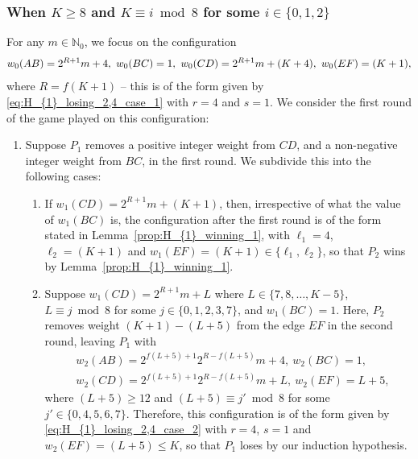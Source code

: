 \documentclass[11pt,reqno]{amsart}
\theoremstyle{definition}
\theoremstyle{definition}
\begin{document}
\subsubsection{When $K \geqslant 8$ and $K \equiv i \bmod 8$ for some $i \in \{0,1,2\}$}\label{subsubsec:H_{1}_losing_4_0,1,2} For any $m \in \mathbb{N}_{0}$, we focus on the configuration
\begin{equation}
w_{0}(AB)=2^{R+1}m+4,\ w_{0}(BC)=1,\ w_{0}(CD)=2^{R+1}m+(K+4),\ w_{0}(EF)=(K+1),\label{eq:H_{1}_losing_4_2_inductive}
\end{equation}
where $R=f(K+1)$ -- this is of the form given by \eqref{eq:H_{1}_losing_2,4_case_1} with $r=4$ and $s=1$. We consider the first round of the game played on this configuration:
\begin{enumerate}
\item Suppose $P_{1}$ removes a positive integer weight from $CD$, and a non-negative integer weight from $BC$, in the first round. We subdivide this into the following cases:
\begin{enumerate}
\item If $w_{1}(CD)=2^{R+1}m+(K+1)$, then, irrespective of what the value of $w_{1}(BC)$ is, the configuration after the first round is of the form stated in Lemma~\ref{prop:H_{1}_winning_1}, with $\ell_{1}=4$, $\ell_{2}=(K+1)$ and $w_{1}(EF)=(K+1) \in \{\ell_{1},\ell_{2}\}$, so that $P_{2}$ wins by Lemma~\ref{prop:H_{1}_winning_1}. 

\item Suppose $w_{1}(CD)=2^{R+1}m+L$ where $L \in \{7,8,\ldots,K-5\}$, $L \equiv j \bmod 8$ for some $j \in \{0,1,2,3,7\}$, and $w_{1}(BC)=1$. Here, $P_{2}$ removes weight $(K+1)-(L+5)$ from the edge $EF$ in the second round, leaving $P_{1}$ with
\begin{align}
{}&w_{2}(AB)=2^{f(L+5)+1}2^{R-f(L+5)}m+4,\ w_{2}(BC)=1,\nonumber\\
{}&w_{2}(CD)=2^{f(L+5)+1}2^{R-f(L+5)}m+L,\ w_{2}(EF)=L+5,\nonumber
\end{align}
where $(L+5) \geqslant 12$ and $(L+5) \equiv j' \bmod 8$ for some $j' \in \{0,4,5,6,7\}$. Therefore, this configuration is of the form given by \eqref{eq:H_{1}_losing_2,4_case_2} with $r=4$, $s=1$ and $w_{2}(EF)=(L+5)\leqslant K$, so that $P_{1}$ loses by our induction hypothesis. 


\end{enumerate}
\end{enumerate}
\end{document}
